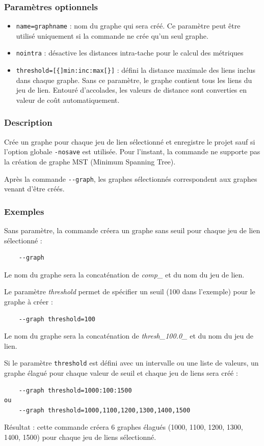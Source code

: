 \documentclass[a4paper,10pt]{report}
\begin{document}
\subsubsection{Paramètres optionnels}
\begin{itemize}
	\item \verb|name=graphname| : nom du graphe qui sera créé. Ce paramètre peut être utilisé uniquement si la commande ne crée qu'un seul graphe.
	\item \verb|nointra| : désactive les distances intra-tache pour le calcul des métriques
	\item \verb|threshold=[{]min:inc:max[}]| : défini la distance maximale des liens inclus dans chaque graphe. Sans ce paramètre, le graphe contient tous les liens du jeu de lien. Entouré d'accolades, les valeurs de distance sont converties en valeur de coût automatiquement.
\end{itemize}

\subsubsection{Description}
Crée un graphe pour chaque jeu de lien sélectionné et enregistre le projet sauf si l'option globale \verb|-nosave| est utilisée.
Pour l'instant, la commande ne supporte pas la création de graphe MST (Minimum Spanning Tree).

Après la commande \verb|--graph|, les graphes sélectionnés correspondent aux graphes venant d'être créés.

\subsubsection{Exemples}
Sans paramètre, la commande créera un graphe sans seuil pour chaque jeu de lien sélectionné :
\begin{Verbatim}
	--graph
\end{Verbatim}
Le nom du graphe sera la concaténation de \textit{comp\_} et du nom du jeu de lien.

Le paramètre \textit{threshold} permet de spécifier un seuil (100 dans l'exemple) pour le graphe à créer :
\begin{Verbatim}
	--graph threshold=100
\end{Verbatim}
Le nom du graphe sera la concaténation de  \textit{thresh\_100.0\_} et du nom du jeu de lien.

Si le paramètre \verb|threshold| est défini avec un intervalle ou une liste de valeurs, un graphe élagué pour chaque valeur de seuil et chaque jeu de liens sera créé :
\begin{Verbatim}
	--graph threshold=1000:100:1500
ou
	--graph threshold=1000,1100,1200,1300,1400,1500
\end{Verbatim}
Résultat : cette commande créera 6 graphes élagués (1000, 1100, 1200, 1300, 1400, 1500) pour chaque jeu de liens sélectionné.
\end{document}
